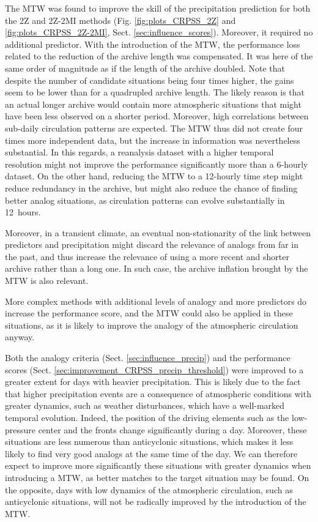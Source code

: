 \documentclass[hess, manuscript]{copernicus}
\begin{document}
The MTW was found to improve the skill of the precipitation prediction for both the 2Z and 2Z-2MI methods (Fig. \ref{fig:plots_CRPSS_2Z} and \ref{fig:plots_CRPSS_2Z-2MI}, Sect. \ref{sec:influence_scores}). Moreover, it required no additional predictor. With the introduction of the MTW, the performance loss related to the reduction of the archive length was compensated. It was here of the same order of magnitude as if the length of the archive doubled. Note that despite the number of candidate situations being four times higher, the gains seem to be lower than for a quadrupled archive length. The likely reason is that an actual longer archive would contain more atmospheric situations that might have been less observed on a shorter period. Moreover, high correlations between sub-daily circulation patterns are expected. The MTW thus did not create four times more independent data, but the increase in information was nevertheless substantial. In this regards, a reanalysis dataset with a higher temporal resolution might not improve the performance significantly more than a 6-hourly dataset. On the other hand, reducing the MTW to a 12-hourly time step might reduce redundancy in the archive, but might also reduce the chance of finding better analog situations, as circulation patterns can evolve substantially in 12~hours.

Moreover, in a transient climate, an eventual non-stationarity of the link between predictors and precipitation might discard the relevance of analogs from far in the past, and thus increase the relevance of using a more recent and shorter archive rather than a long one. In such case, the archive inflation brought by the MTW is also relevant.

More complex methods with additional levels of analogy and more predictors do increase the performance score, and the MTW could also be applied in these situations, as it is likely to improve the analogy of the atmospheric circulation anyway. 

Both the analogy criteria (Sect. \ref{sec:influence_precip}) and the performance scores (Sect. \ref{sec:improvement_CRPSS_precip_threshold}) were improved to a greater extent for days with heavier precipitation. This is likely due to the fact that higher precipitation events are a consequence of atmospheric conditions with greater dynamics, such as weather disturbances, which have a well-marked temporal evolution. Indeed, the position of the driving elements such as the low-pressure center and the fronts change significantly during a day. Moreover, these situations are less numerous than anticyclonic situations, which makes it less likely to find very good analogs at the same time of the day. We can therefore expect to improve more significantly these situations with greater dynamics when introducing a MTW, as better matches to the target situation may be found. On the opposite, days with low dynamics of the atmospheric circulation, such as anticyclonic situations, will not be radically improved by the introduction of the MTW.
\end{document}
